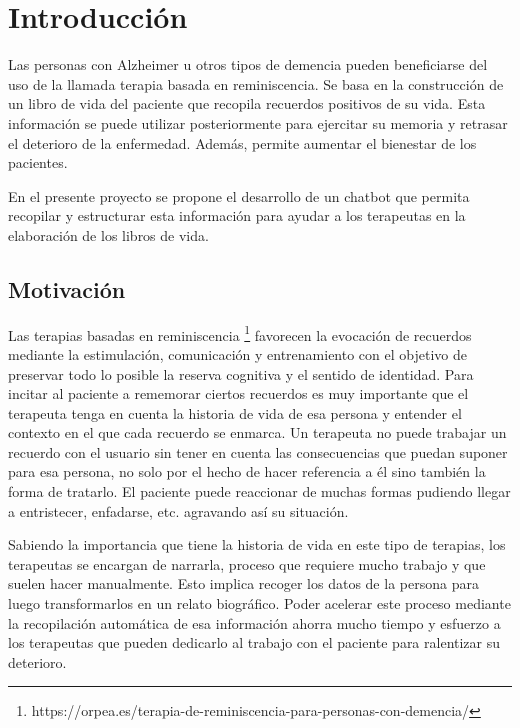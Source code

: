 \chapter{Introducción}
\label{cap:introduccion}



Las personas con Alzheimer u otros tipos de demencia pueden beneficiarse del uso de la llamada terapia basada en reminiscencia. Se basa en la construcción de un libro de vida del paciente que recopila recuerdos positivos de su vida. Esta información se puede utilizar posteriormente para ejercitar su memoria y retrasar el deterioro de la enfermedad. Además, permite aumentar el bienestar de los pacientes.

En el presente proyecto se propone el desarrollo de un chatbot que permita recopilar y estructurar esta información para ayudar a los terapeutas en la elaboración de los libros de vida.


\section{Motivación}

Las terapias basadas en reminiscencia \footnote{https://orpea.es/terapia-de-reminiscencia-para-personas-con-demencia/} favorecen la evocación de recuerdos mediante la estimulación, comunicación y entrenamiento con el objetivo de preservar todo lo posible la reserva cognitiva y el sentido de identidad. Para incitar al paciente a rememorar ciertos recuerdos es muy importante que el terapeuta tenga en cuenta la historia de vida de esa persona y entender el contexto en el que cada recuerdo se enmarca. Un terapeuta no puede trabajar un recuerdo con el usuario sin tener en cuenta las consecuencias que puedan suponer para esa persona, no solo por el hecho de hacer referencia a él sino también la forma de tratarlo. El paciente puede reaccionar de muchas formas pudiendo llegar a entristecer, enfadarse, etc. agravando así su situación.

Sabiendo la importancia que tiene la historia de vida en este tipo de terapias, los terapeutas se encargan de narrarla, proceso que requiere mucho trabajo y que suelen hacer manualmente. Esto implica recoger los datos de la persona para luego transformarlos en un relato biográfico. Poder acelerar este proceso mediante la recopilación automática de esa información ahorra mucho tiempo y esfuerzo a los terapeutas que pueden dedicarlo al trabajo con el paciente para ralentizar su deterioro.


